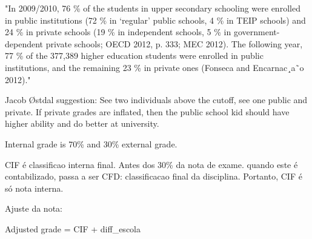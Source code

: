 \documentclass{article}
\begin{document}
"In 2009/2010, 76 \% of the students in upper secondary schooling were enrolled in public institutions (72 \% in ‘regular’ public schools, 4 \% in TEIP schools) and 24 \% in private schools (19 \% in independent schools, 5 \% in government-dependent private schools; OECD 2012, p. 333; MEC 2012). The following year, 77 \% of the 377,389 higher education students were enrolled in public institutions, and the remaining 23 \% in private ones (Fonseca and Encarnac¸a˜o 2012)."



Jacob Østdal suggestion: See two individuals above the cutoff, see one public and private. If private grades are inflated, then the public school kid should have higher ability and do better at university.


Internal grade is 70\% and 30\% external grade.

CIF é classificao interna final. Antes dos 30\% da nota de exame. quando este é contabilizado, passa a ser CFD: classificacao final da disciplina.
Portanto, CIF é só nota interna.

Ajuste da nota:

Adjusted grade = CIF + diff\_escola
\end{document}
